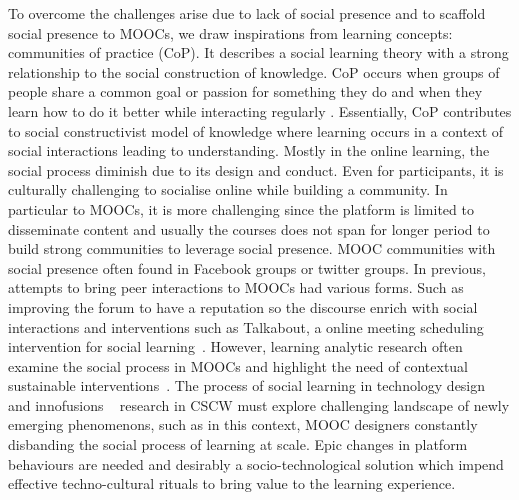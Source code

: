 \documentclass[manuscript,screen,review]{acmart}
\begin{document}
To overcome the challenges arise due to lack of social presence and to scaffold social presence to MOOCs, we draw inspirations from learning concepts: communities of practice (CoP). It describes a social learning theory with a strong relationship to the social construction of knowledge. CoP occurs when groups of people share a common goal or passion for something they do and when they learn how to do it better while interacting regularly \cite{wenger1999communities}. Essentially, CoP contributes to social constructivist model of knowledge where learning occurs in a context of social interactions leading to understanding. Mostly in the online learning, the social process diminish due to its design and conduct. Even for participants, it is culturally challenging to socialise online while building a community. In particular to MOOCs, it is more challenging since the platform is limited to disseminate content and usually the courses does not span for longer period to build strong communities to leverage social presence. MOOC communities with social presence often found in Facebook groups or twitter groups. In previous,  attempts to bring peer interactions to MOOCs had various forms. Such as improving the forum to have a reputation so the discourse enrich with social interactions and interventions such as Talkabout, a online meeting scheduling intervention for social learning~\cite{kulkarni2015talkabout}. However, learning analytic research often examine the social process in MOOCs and highlight the need of contextual sustainable interventions~\cite{poquet2018mooc}. The process of social learning in technology design and innofusions ~\cite{williams2005social} research in CSCW  must explore  challenging landscape of newly emerging phenomenons, such as in this context, MOOC designers constantly disbanding the social process of learning at scale. Epic changes in platform behaviours are needed and desirably a socio-technological solution which impend effective techno-cultural rituals to bring value to the learning experience. 
\end{document}
